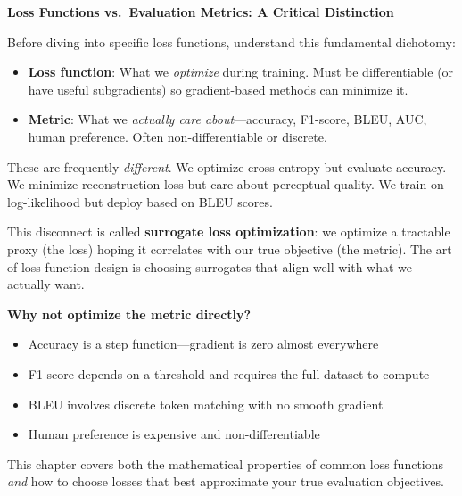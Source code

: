 \documentclass[../../main.tex]{subfiles}
\begin{document}
\begin{important}
\textbf{Loss Functions vs.\ Evaluation Metrics: A Critical Distinction}

Before diving into specific loss functions, understand this fundamental dichotomy:

\begin{itemize}
    \item \textbf{Loss function}: What we \emph{optimize} during training. Must be differentiable (or have useful subgradients) so gradient-based methods can minimize it.
    \item \textbf{Metric}: What we \emph{actually care about}---accuracy, F1-score, BLEU, AUC, human preference. Often non-differentiable or discrete.
\end{itemize}

These are frequently \emph{different}. We optimize cross-entropy but evaluate accuracy. We minimize reconstruction loss but care about perceptual quality. We train on log-likelihood but deploy based on BLEU scores.

This disconnect is called \textbf{surrogate loss optimization}: we optimize a tractable proxy (the loss) hoping it correlates with our true objective (the metric). The art of loss function design is choosing surrogates that align well with what we actually want.

\textbf{Why not optimize the metric directly?}
\begin{itemize}
    \item Accuracy is a step function---gradient is zero almost everywhere
    \item F1-score depends on a threshold and requires the full dataset to compute
    \item BLEU involves discrete token matching with no smooth gradient
    \item Human preference is expensive and non-differentiable
\end{itemize}

This chapter covers both the mathematical properties of common loss functions \emph{and} how to choose losses that best approximate your true evaluation objectives.
\end{important}

\end{document}
